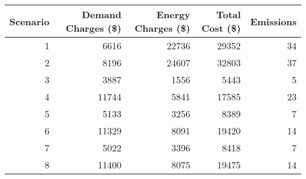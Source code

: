 \begin{tabular}{rrrrr}
\toprule
 Scenario &  Demand Charges (\$) &  Energy Charges (\$) &  Total Cost (\$) &  Emissions \\
\midrule
        1 &                6616 &               22736 &           29352 &         34 \\
        2 &                8196 &               24607 &           32803 &         37 \\
        3 &                3887 &                1556 &            5443 &          5 \\
        4 &               11744 &                5841 &           17585 &         23 \\
        5 &                5133 &                3256 &            8389 &          7 \\
        6 &               11329 &                8091 &           19420 &         14 \\
        7 &                5022 &                3396 &            8418 &          7 \\
        8 &               11400 &                8075 &           19475 &         14 \\
\bottomrule
\end{tabular}
